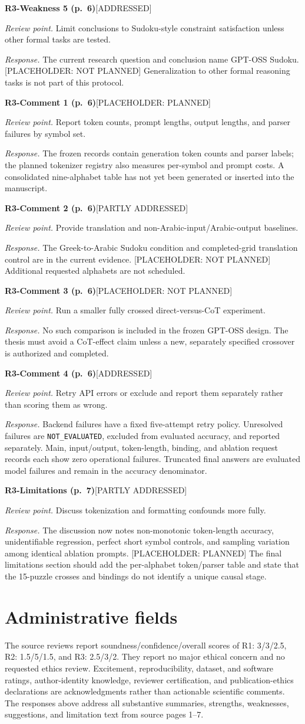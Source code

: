\documentclass[10pt,a4paper]{article}
\newcommand{\Done}{\textcolor{done}{\textsf{[ADDRESSED]}}}
\newcommand{\Partial}{\textcolor{pending}{\textsf{[PARTLY ADDRESSED]}}}
\newcommand{\Planned}{\textcolor{pending}{\textsf{[PLACEHOLDER: PLANNED]}}}
\newcommand{\Open}{\textcolor{open}{\textsf{[PLACEHOLDER: NOT PLANNED]}}}
\newcommand{\itemresponse}[4]{%
  \Needspace{5\baselineskip}%
  \par\vspace{0.65\baselineskip}%
  \noindent\textbf{#1}\quad #2\par
  \noindent\emph{Review point.} #3\par
  \noindent\emph{Response.} #4\par
}
\begin{document}
\itemresponse{R3-Weakness 5 (p.~6)}{\Done}{Limit conclusions to Sudoku-style constraint satisfaction unless other formal tasks are tested.}{The current research question and conclusion name GPT-OSS Sudoku. \Open{} Generalization to other formal reasoning tasks is not part of this protocol.}

\itemresponse{R3-Comment 1 (p.~6)}{\Planned}{Report token counts, prompt lengths, output lengths, and parser failures by symbol set.}{The frozen records contain generation token counts and parser labels; the planned tokenizer registry also measures per-symbol and prompt costs. A consolidated nine-alphabet table has not yet been generated or inserted into the manuscript.}

\itemresponse{R3-Comment 2 (p.~6)}{\Partial}{Provide translation and non-Arabic-input/Arabic-output baselines.}{The Greek-to-Arabic Sudoku condition and completed-grid translation control are in the current evidence. \Open{} Additional requested alphabets are not scheduled.}

\itemresponse{R3-Comment 3 (p.~6)}{\Open}{Run a smaller fully crossed direct-versus-CoT experiment.}{No such comparison is included in the frozen GPT-OSS design. The thesis must avoid a CoT-effect claim unless a new, separately specified crossover is authorized and completed.}

\itemresponse{R3-Comment 4 (p.~6)}{\Done}{Retry API errors or exclude and report them separately rather than scoring them as wrong.}{Backend failures have a fixed five-attempt retry policy. Unresolved failures are \texttt{NOT\_EVALUATED}, excluded from evaluated accuracy, and reported separately. Main, input/output, token-length, binding, and ablation request records each show zero operational failures. Truncated final answers are evaluated model failures and remain in the accuracy denominator.}

\itemresponse{R3-Limitations (p.~7)}{\Partial}{Discuss tokenization and formatting confounds more fully.}{The discussion now notes non-monotonic token-length accuracy, unidentifiable regression, perfect short symbol controls, and sampling variation among identical ablation prompts. \Planned{} The final limitations section should add the per-alphabet token/parser table and state that the 15-puzzle crosses and bindings do not identify a unique causal stage.}

\section*{Administrative fields}
\noindent The source reviews report soundness/confidence/overall scores of R1: 3/3/2.5, R2: 1.5/5/1.5, and R3: 2.5/3/2. They report no major ethical concern and no requested ethics review. Excitement, reproducibility, dataset, and software ratings, author-identity knowledge, reviewer certification, and publication-ethics declarations are acknowledgments rather than actionable scientific comments. The responses above address all substantive summaries, strengths, weaknesses, suggestions, and limitation text from source pages 1--7.
\end{document}
